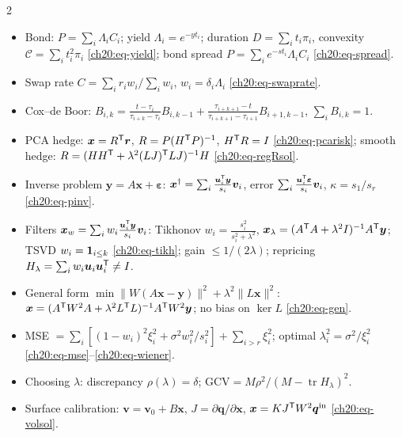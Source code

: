 \begin{paracol}{2}
\begin{keyformulas}
\begin{itemize}
  \item Bond: $P=\sum_i\Lambda_iC_i$; yield $\Lambda_i=e^{-yt_i}$; duration $D=\sum_it_i\pi_i$, convexity $\mathcal C=\sum_it_i^2\pi_i$ \eqref{ch20:eq-yield}; bond spread $P=\sum_ie^{-st_i}\Lambda_iC_i$ \eqref{ch20:eq-spread}.
  \item Swap rate $C=\sum_ir_iw_i/\sum_iw_i$, $w_i=\delta_i\Lambda_i$ \eqref{ch20:eq-swaprate}.
  \item Cox--de Boor: $B_{i,k}=\frac{t-\tau_i}{\tau_{i+k}-\tau_i}B_{i,k-1}+\frac{\tau_{i+k+1}-t}{\tau_{i+k+1}-\tau_{i+1}}B_{i+1,k-1}$, $\sum_iB_{i,k}=1$.
  \item PCA hedge: $\bm x=R^{\mathsf T}\bm r$, $R=P(H^{\mathsf T} P)^{-1}$, $H^{\mathsf T} R=I$ \eqref{ch20:eq-pcarisk}; smooth hedge: $R=(HH^{\mathsf T}+\lambda^2(LJ)^{\mathsf T} LJ)^{-1}H$ \eqref{ch20:eq-regRsol}.
  \item Inverse problem $\bm y=A\bm x+\bm\varepsilon$: $\bm x^\dagger=\sum_i\frac{\bm u_i^{\mathsf T}\bm y}{s_i}\bm v_i$, error $\sum_i\frac{\bm u_i^{\mathsf T}\bm\varepsilon}{s_i}\bm v_i$, $\kappa=s_1/s_r$ \eqref{ch20:eq-pinv}.
  \item Filters $\bm x_w=\sum_iw_i\frac{\bm u_i^{\mathsf T}\bm y}{s_i}\bm v_i$: Tikhonov $w_i=\frac{s_i^2}{s_i^2+\lambda^2}$, $\bm x_\lambda=(A^{\mathsf T} A+\lambda^2I)^{-1}A^{\mathsf T}\bm y$; TSVD $w_i=\mathbf{1}_{i\le k}$ \eqref{ch20:eq-tikh}; gain $\le1/(2\lambda)$; repricing $H_\lambda=\sum_iw_i\bm u_i\bm u_i^{\mathsf T}\ne I$.
  \item General form $\min\|W(A\bm x-\bm y)\|^2+\lambda^2\|L\bm x\|^2$: $\bm x=(A^{\mathsf T} W^2A+\lambda^2L^{\mathsf T} L)^{-1}A^{\mathsf T} W^2\bm y$; no bias on $\ker L$ \eqref{ch20:eq-gen}.
  \item MSE $=\sum_i[(1-w_i)^2\xi_i^2+\sigma^2w_i^2/s_i^2]+\sum_{i>r}\xi_i^2$; optimal $\lambda_i^2=\sigma^2/\xi_i^2$ \eqref{ch20:eq-mse}--\eqref{ch20:eq-wiener}.
  \item Choosing $\lambda$: discrepancy $\rho(\lambda)=\delta$; $\mathrm{GCV}=M\rho^2/(M-\operatorname{tr}H_\lambda)^2$.
  \item Surface calibration: $\bm v=\bm v_0+B\bm x$, $J=\partial\bm q/\partial\bm x$, $\bm x=KJ^{\mathsf T} W^2\bm q^{\rm in}$ \eqref{ch20:eq-volsol}.
\end{itemize}
\end{keyformulas}


\end{paracol}
